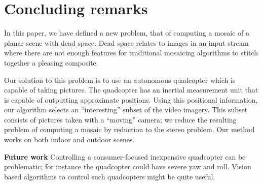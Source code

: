 \documentclass[10pt,twocolumn,letterpaper]{article}
\begin{document}


\section{Concluding remarks}

In this paper, we have defined a new problem, that of computing a
mosaic of a planar scene with dead space.  Dead space relates to images
in an input stream where there are not enough features for traditional
mosaicing algorithms to stitch together a pleasing composite.  

Our solution to this problem is to use an autonomous quadcopter which
is capable of taking pictures.  The quadcopter has an inertial
measurement unit that is capable of outputting approximate
positions. Using this positional information, our algorithm selects an
``interesting'' subset of the video imagery.  This subset consists of
pictures taken with a ``moving'' camera; we reduce the resulting
problem of computing a mosaic by reduction to the stereo problem.  Our
method works on both indoor and outdoor scenes.

{\bf Future work} Controlling a consumer-focused inexpensive
quadcopter can be problematic; for instance the quadcopter could have
severe yaw and roll.  Vision based algorithms to control such
quadcopters might be quite useful.




\end{document}

